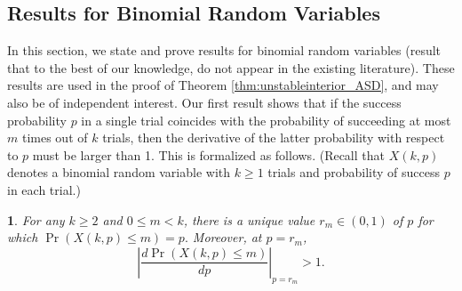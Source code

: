 \documentclass[12pt]{article}
\numberwithin{equation}{section}
\numberwithin{figure}{section}
\theoremstyle{definition}
\theoremstyle{plain}
\theoremstyle{plain}
\newtheorem{prop}{\protect\propositionname}
\theoremstyle{plain}
\theoremstyle{remark}
\theoremstyle{plain}
\theoremstyle{plain}
\providecommand{\propositionname}{Proposition}
\begin{document}
\subsection{Results for Binomial Random Variables}\label{sub:binomial-proofs}
In this section, we state and prove results for binomial random variables 
(result that to the best of our knowledge, do not appear in the existing literature). These results are used in  the proof of Theorem \ref{thm:unstableinterior_ASD}, and may also be of independent interest. Our first result shows that if the success probability $p$ in a single trial coincides with the probability of succeeding at most $m$ times out of $k$ trials, then the derivative of the latter probability with respect to $p$ must be larger than 1. This is formalized as follows. (Recall that $X(k,p)$ denotes a binomial random variable with $k\geq1$ trials and probability of success $p$ in each trial.)
\begin{prop} \label{pro-binom-deriv>1}
For any $k\geq2$ and $0\leq m<k$, there is a unique value $r_m\in(0,1)$ of $p$ for which 
$\Pr\left(X(k,p)\leq m\right)=p.$
Moreover, at $p=r_m$,
\[\left|\frac{d\Pr\left(X(k,p)\leq m\right)}{dp}\right|_{p=r_m}>1.
\]

\end{prop}
\end{document}
